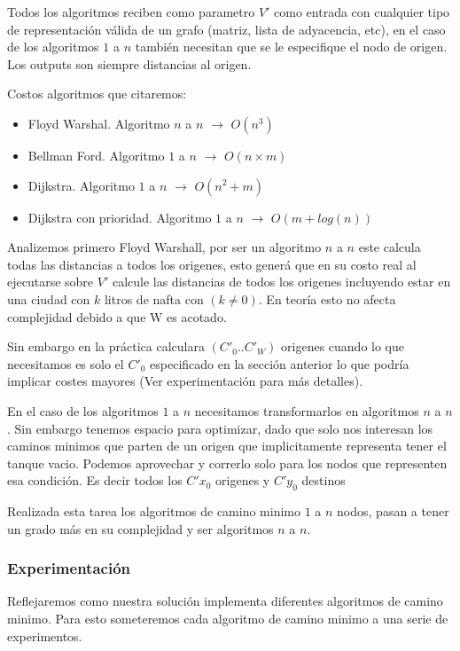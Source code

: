 \documentclass[12pt]{article}
\begin{document}
Todos los algoritmos reciben como parametro $V'$ como entrada con cualquier tipo de representación válida de un grafo (matriz, lista de adyacencia, etc), en el caso de los algoritmos $1$ a $n$ también necesitan que se le especifique el nodo de origen. Los outputs son siempre distancias al origen.

Costos algoritmos que citaremos:
\begin{itemize}
	\item Floyd Warshal. Algoritmo $n$ a $n$ $\rightarrow$  $O(n^3)$
	\item Bellman Ford. Algoritmo $1$ a $n$ $\rightarrow$ $O(n \times m)$
	\item Dijkstra. Algoritmo $1$ a $n$ $\rightarrow$ $O(n^2+m)$
	\item Dijkstra con prioridad. Algoritmo $1$ a $n$ $\rightarrow$  $O(m + log (n))$
\end{itemize}

Analizemos primero Floyd Warshall, por ser un algoritmo $n$ a $n$ este calcula todas las distancias a todos los origenes, esto generá que en su costo real al ejecutarse sobre $V'$ calcule las distancias de todos los origenes incluyendo estar en una ciudad con $k$ litros de nafta con $(k \neq 0)$. En teoría esto no afecta complejidad debido a que W es acotado.

Sin embargo en la práctica calculara $(C'_0..C'_W)$ origenes cuando lo que necesitamos es solo el $C'_0$ especificado en la sección anterior lo que podría implicar costes mayores (Ver experimentación para más detalles).

En el caso de los algoritmos $1$ a $n$ necesitamos transformarlos en algoritmos $n$ a $n$. Sin embargo tenemos espacio para optimizar, dado que solo nos interesan los caminos minimos que parten de un origen que implicitamente representa tener el tanque vacio. Podemos aprovechar y correrlo solo para los nodos que representen esa condición. Es decir todos los $C'{x_0}$ origenes y $C'{y_0}$ destinos

Realizada esta tarea los algoritmos de camino minimo $1$ a $n$ nodos, pasan a tener un grado más en su complejidad y ser algoritmos $n$ a $n$.

\subsubsection{Experimentación}

Reflejaremos como nuestra solución implementa diferentes algoritmos de camino minimo. Para esto someteremos cada algoritmo de camino minimo a una serie de experimentos.
\end{document}
